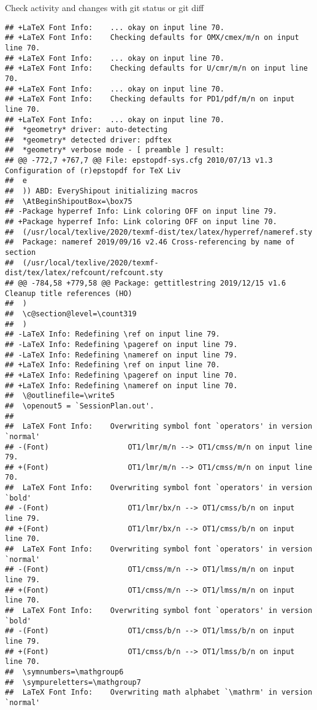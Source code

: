 \documentclass[ignorenonframetext,]{beamer}
\begin{document}
\begin{frame}[fragile]{Check activity and changes with git status or git
diff}
\begin{verbatim}
## +LaTeX Font Info:    ... okay on input line 70.
## +LaTeX Font Info:    Checking defaults for OMX/cmex/m/n on input line 70.
## +LaTeX Font Info:    ... okay on input line 70.
## +LaTeX Font Info:    Checking defaults for U/cmr/m/n on input line 70.
## +LaTeX Font Info:    ... okay on input line 70.
## +LaTeX Font Info:    Checking defaults for PD1/pdf/m/n on input line 70.
## +LaTeX Font Info:    ... okay on input line 70.
##  *geometry* driver: auto-detecting
##  *geometry* detected driver: pdftex
##  *geometry* verbose mode - [ preamble ] result:
## @@ -772,7 +767,7 @@ File: epstopdf-sys.cfg 2010/07/13 v1.3 Configuration of (r)epstopdf for TeX Liv
##  e
##  )) ABD: EveryShipout initializing macros
##  \AtBeginShipoutBox=\box75
## -Package hyperref Info: Link coloring OFF on input line 79.
## +Package hyperref Info: Link coloring OFF on input line 70.
##  (/usr/local/texlive/2020/texmf-dist/tex/latex/hyperref/nameref.sty
##  Package: nameref 2019/09/16 v2.46 Cross-referencing by name of section
##  (/usr/local/texlive/2020/texmf-dist/tex/latex/refcount/refcount.sty
## @@ -784,58 +779,58 @@ Package: gettitlestring 2019/12/15 v1.6 Cleanup title references (HO)
##  )
##  \c@section@level=\count319
##  )
## -LaTeX Info: Redefining \ref on input line 79.
## -LaTeX Info: Redefining \pageref on input line 79.
## -LaTeX Info: Redefining \nameref on input line 79.
## +LaTeX Info: Redefining \ref on input line 70.
## +LaTeX Info: Redefining \pageref on input line 70.
## +LaTeX Info: Redefining \nameref on input line 70.
##  \@outlinefile=\write5
##  \openout5 = `SessionPlan.out'.
##  
##  LaTeX Font Info:    Overwriting symbol font `operators' in version `normal'
## -(Font)                  OT1/lmr/m/n --> OT1/cmss/m/n on input line 79.
## +(Font)                  OT1/lmr/m/n --> OT1/cmss/m/n on input line 70.
##  LaTeX Font Info:    Overwriting symbol font `operators' in version `bold'
## -(Font)                  OT1/lmr/bx/n --> OT1/cmss/b/n on input line 79.
## +(Font)                  OT1/lmr/bx/n --> OT1/cmss/b/n on input line 70.
##  LaTeX Font Info:    Overwriting symbol font `operators' in version `normal'
## -(Font)                  OT1/cmss/m/n --> OT1/lmss/m/n on input line 79.
## +(Font)                  OT1/cmss/m/n --> OT1/lmss/m/n on input line 70.
##  LaTeX Font Info:    Overwriting symbol font `operators' in version `bold'
## -(Font)                  OT1/cmss/b/n --> OT1/lmss/b/n on input line 79.
## +(Font)                  OT1/cmss/b/n --> OT1/lmss/b/n on input line 70.
##  \symnumbers=\mathgroup6
##  \sympureletters=\mathgroup7
##  LaTeX Font Info:    Overwriting math alphabet `\mathrm' in version `normal'

\end{verbatim}
\end{frame}
\end{document}

